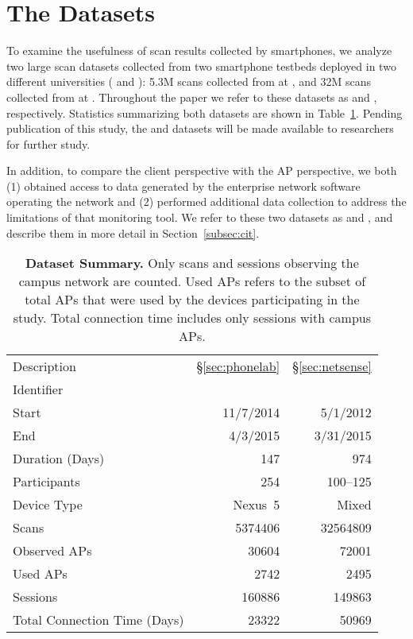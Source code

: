 
\section{The Datasets}
\label{sec:dataset}

To examine the usefulness of \wifi{} scan results collected by smartphones, we
analyze two large scan datasets collected from two smartphone testbeds deployed
in two different universities (\ub{} and \nd{}): 5.3M scans collected from
\PhoneLab{} at \ub{}, and 32M scans collected from \NetSense{} at \nd{}.
Throughout the paper we refer to these datasets as \textbf{\ubscan{}} and
\textbf{\ndscan{}}, respectively.  Statistics summarizing both datasets are
shown in Table~\ref{tab:stats}. Pending publication of this study, the \ubscan{}
and \ndscan{} datasets will be made available to researchers for further study.

In addition, to compare the client perspective with the AP perspective, we
both (1) obtained access to data generated by the enterprise network software
operating the \ub{} \wifi{} network and (2) performed additional data collection
to address the limitations of that monitoring tool. We refer to these two
datasets as \textbf{\ubap{}} and \textbf{\ubapdetail{}}, and describe them in
more detail in Section~\ref{subsec:cit}.

\begin{table}[t]
  {\small
  \begin{tabularx}{\columnwidth}{Xrr}
    & \PhoneLab{} & \NetSense{}\\\midrule
    Description & \S\ref{sec:phonelab} & \S\ref{sec:netsense} \\
    Identifier & \ubscan{} & \ndscan{} \\ 
    Start & 11/7/2014 & 5/1/2012 \\ 
    End & 4/3/2015 & 3/31/2015 \\ 
    Duration (Days) & 147 & 974 \\ \midrule
    Participants & 254 & 100--125 \\
    Device Type & Nexus~5 & Mixed \\ \midrule
    Scans & \num{5374406} & \num{32564809} \\
    Observed APs & \num{30604} & \num{72001} \\
    Used APs & \num{2742} & \num{2495}\\ \midrule
    \wifi{} Sessions & \num{160886} & \num{149863} \\
    Total Connection Time (Days) & \num{23322} & \num{50969} 
  \end{tabularx}
  \caption{\textbf{Dataset Summary.} Only \wifi{} scans and sessions
  observing the campus network are counted. Used APs refers to the subset of
  total APs that were used by the devices participating in the study. Total
connection time includes only \wifi{} sessions with campus APs.}
  \label{tab:stats}
}
\end{table}


